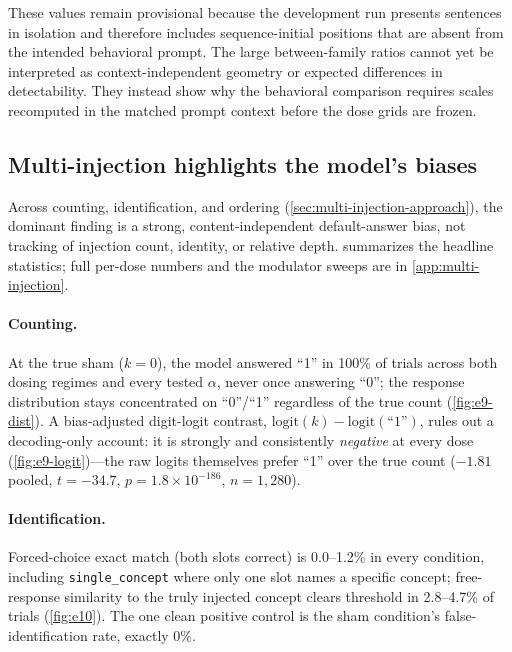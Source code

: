 These values remain provisional because the development run presents sentences in isolation and therefore includes sequence-initial positions that are absent from the intended behavioral prompt.
The large between-family ratios cannot yet be interpreted as context-independent geometry or expected differences in detectability.
They instead show why the behavioral comparison requires scales recomputed in the matched prompt context before the dose grids are frozen.



\subsection{Multi-injection highlights the model's biases}
\label{sec:multi-injection-results}

Across counting, identification, and ordering (\cref{sec:multi-injection-approach}), the dominant finding is a strong, content-independent default-answer bias, not tracking of injection count, identity, or relative depth.
 summarizes the headline statistics; full per-dose numbers and the modulator sweeps are in \cref{app:multi-injection}.

\paragraph{Counting.}
At the true sham ($k{=}0$), the model answered ``1'' in 100\% of trials across both dosing regimes and every tested $\alpha$, never once answering ``0''; the response distribution stays concentrated on ``0''/``1'' regardless of the true count (\cref{fig:e9-dist}).
A bias-adjusted digit-logit contrast, $\mathrm{logit}(k)-\mathrm{logit}(\text{``1''})$, rules out a decoding-only account: it is strongly and consistently \emph{negative} at every dose (\cref{fig:e9-logit})---the raw logits themselves prefer ``1'' over the true count ($-1.81$ pooled, $t=-34.7$, $p=1.8\times10^{-186}$, $n=1{,}280$).

\paragraph{Identification.}
Forced-choice exact match (both slots correct) is 0.0--1.2\% in every condition, including \texttt{single\_concept} where only one slot names a specific concept; free-response similarity to the truly injected concept clears threshold in 2.8--4.7\% of trials (\cref{fig:e10}).
The one clean positive control is the sham condition's false-identification rate, exactly 0\%.


